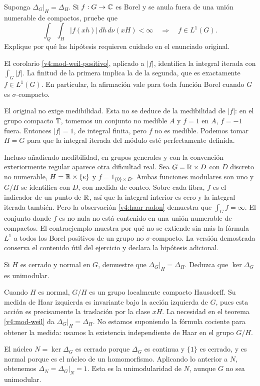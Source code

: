 \begin{ejercicio}\label{ej:v4-l21-1}
Suponga $\Delta_G|_H=\Delta_H$. Si $f:G\to\mathbb C$ es Borel y se anula fuera de una unión numerable de compactos, pruebe que
\[
 \int_Q\int_H|f(xh)|\,dh\,d\nu(xH)<\infty
 \quad\Longrightarrow\quad f\in L^1(G).
\]
Explique por qué las hipótesis requieren cuidado en el enunciado original.
\end{ejercicio}
\begin{solucion}
El corolario \ref{v4:mod-weil-positivo}, aplicado a $|f|$, identifica la integral iterada con $\int_G|f|$. La finitud de la primera implica la de la segunda, que es exactamente $f\in L^1(G)$. En particular, la afirmación vale para toda función Borel cuando $G$ es $\sigma$-compacto.

El original no exige medibilidad. Esta no se deduce de la medibilidad de $|f|$: en el grupo compacto $\mathbb T$, tomemos un conjunto no medible $A$ y $f=1$ en $A$, $f=-1$ fuera. Entonces $|f|=1$, de integral finita, pero $f$ no es medible. Podemos tomar $H=G$ para que la integral iterada del módulo esté perfectamente definida.

Incluso añadiendo medibilidad, en grupos generales y con la convención exteriormente regular aparece otra dificultad real. Sea $G=\mathbb R\times D$ con $D$ discreto no numerable, $H=\mathbb R\times\{e\}$ y $f=1_{\{0\}\times D}$. Ambas funciones modulares son uno y $G/H$ se identifica con $D$, con medida de conteo. Sobre cada fibra, $f$ es el indicador de un punto de $\mathbb R$, así que la integral interior es cero y la integral iterada también. Pero la observación \ref{v4:haar-radon} demuestra que $\int_Gf=\infty$. El conjunto donde $f$ es no nula no está contenido en una unión numerable de compactos. El contraejemplo muestra por qué no se extiende sin más la fórmula $L^1$ a todos los Borel positivos de un grupo no $\sigma$-compacto. La versión demostrada conserva el contenido útil del ejercicio y declara la hipótesis adicional.
\end{solucion}

\begin{ejercicio}\label{ej:v4-l21-2}
Si $H$ es cerrado y normal en $G$, demuestre que $\Delta_G|_H=\Delta_H$. Deduzca que $\ker\Delta_G$ es unimodular.
\end{ejercicio}
\begin{solucion}
Cuando $H$ es normal, $G/H$ es un grupo localmente compacto Hausdorff. Su medida de Haar izquierda es invariante bajo la acción izquierda de $G$, pues esta acción es precisamente la traslación por la clase $xH$. La necesidad en el teorema \ref{v4:mod-weil} da $\Delta_G|_H=\Delta_H$. No estamos suponiendo la fórmula cociente para obtener la medida: usamos la existencia independiente de Haar en el grupo $G/H$.

El núcleo $N=\ker\Delta_G$ es cerrado porque $\Delta_G$ es continua y $\{1\}$ es cerrado, y es normal porque es el núcleo de un homomorfismo. Aplicando lo anterior a $N$, obtenemos $\Delta_N=\Delta_G|_N=1$. Esta es la unimodularidad de $N$, aunque $G$ no sea unimodular.
\end{solucion}


